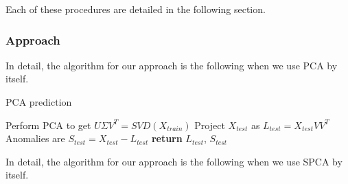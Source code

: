 \documentclass[conference]{IEEEtran}
\begin{document}
Each of these procedures are detailed in the following section.


\subsubsection{Approach}


In detail, the algorithm for our approach is the following when we use PCA by itself.  

\begin{algorithm}
\caption{PCA prediction}\label{alg:pca prediction}
\begin{algorithmic}[1]
\State Perform PCA to get $U \Sigma V^T = SVD(X_{train})$
\State Project $X_{test}$ as $L_{test} = X_{test} V V^T$
\State Anomalies are $S_{test} = X_{test} - L_{test}$
\State \textbf{return} $L_{test}$, $S_{test}$
\EndProcedure
\end{algorithmic}
\end{algorithm}

In detail, the algorithm for our approach is the following when we use SPCA by itself.
\end{document}
